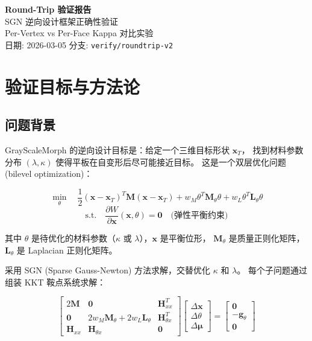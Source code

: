 \documentclass[12pt,a4paper]{article}
\begin{document}
\begin{center}
    {\LARGE\bfseries Round-Trip 验证报告}\\[0.8em]
    {\large SGN 逆向设计框架正确性验证}\\[0.4em]
    {\large Per-Vertex vs Per-Face Kappa 对比实验}\\[0.8em]
    {\small 日期: 2026-03-05 \quad 分支: \texttt{verify/roundtrip-v2}}
\end{center}

\vspace{1em}
\tableofcontents
\newpage

\section{验证目标与方法论}

\subsection{问题背景}

GrayScaleMorph 的逆向设计目标是：给定一个三维目标形状 $\mathbf{x}_T$，
找到材料参数分布 $(\lambda, \kappa)$ 使得平板在自变形后尽可能接近目标。
这是一个双层优化问题 (bilevel optimization)：

\begin{equation}
\min_{\theta} \quad \frac{1}{2}(\mathbf{x} - \mathbf{x}_T)^T \mathbf{M} (\mathbf{x} - \mathbf{x}_T)
+ w_M \theta^T \mathbf{M}_\theta \theta + w_L \theta^T \mathbf{L}_\theta \theta
\end{equation}
\begin{equation}
\text{s.t.} \quad \frac{\partial W}{\partial \mathbf{x}}(\mathbf{x}, \theta) = \mathbf{0}
\quad \text{(弹性平衡约束)}
\end{equation}

其中 $\theta$ 是待优化的材料参数（$\kappa$ 或 $\lambda$），$\mathbf{x}$ 是平衡位形，
$\mathbf{M}_\theta$ 是质量正则化矩阵，$\mathbf{L}_\theta$ 是 Laplacian 正则化矩阵。

采用 SGN (Sparse Gauss-Newton) 方法求解，交替优化 $\kappa$ 和 $\lambda$。
每个子问题通过组装 KKT 鞍点系统求解：

\begin{equation}
\begin{bmatrix}
2\mathbf{M} & \mathbf{0} & \mathbf{H}_{xx}^T \\
\mathbf{0} & 2w_M \mathbf{M}_\theta + 2w_L \mathbf{L}_\theta & \mathbf{H}_{\theta x}^T \\
\mathbf{H}_{xx} & \mathbf{H}_{\theta x} & \mathbf{0}
\end{bmatrix}
\begin{bmatrix} \Delta \mathbf{x} \\ \Delta \theta \\ \Delta \boldsymbol{\mu} \end{bmatrix}
=
\begin{bmatrix} \mathbf{0} \\ -\mathbf{g}_\theta \\ \mathbf{0} \end{bmatrix}
\end{equation}
\end{document}
